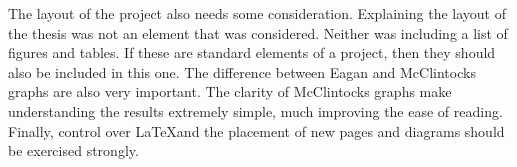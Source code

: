\documentclass[../main.tex]{subfiles}
\begin{document}
    The layout of the project also needs some consideration.
    Explaining the layout of the thesis was not an element that was considered.
    Neither was including a list of figures and tables.
    If these are standard elements of a project, then they should also be included in this one.
    The difference between Eagan and McClintocks graphs are also very important.
    The clarity of McClintocks graphs make understanding the results extremely simple, much improving the ease of reading.
    Finally, control over \LaTeX and the placement of new pages and diagrams should be exercised strongly.
    
  \biblio
\end{document}
